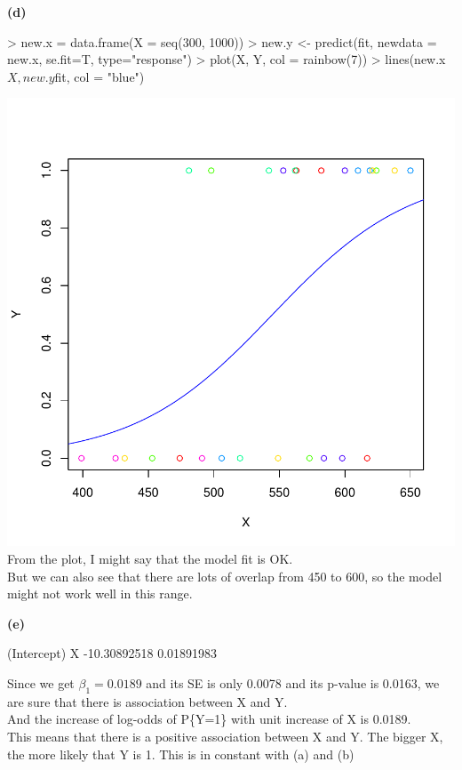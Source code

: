 \documentclass[a4paper]{article}
\renewcommand{\part}[1] {\vspace{.10in} {\bf (#1)}}
\begin{document}
\part{d}
\begin{Schunk}
\begin{Sinput}
> new.x = data.frame(X = seq(300, 1000))
> new.y <- predict(fit, newdata = new.x, se.fit=T, type="response")
> plot(X, Y, col = rainbow(7))
> lines(new.x$X, new.y$fit, col = "blue")
\end{Sinput}
\end{Schunk}
\includegraphics{category_response-1d}
{\color{red}\\
From the plot, I might say that the model fit is OK.\\
But we can also see that there are lots of overlap from 450 to 600, so the model might not work well in this range.
}

\part{e}
\begin{Schunk}
\begin{Soutput}
 (Intercept)            X 
-10.30892518   0.01891983 
\end{Soutput}
\end{Schunk}
{\color{red}
Since we get $\beta_1 = 0.0189$ and its SE is only 0.0078 and its p-value is 0.0163, we are sure that there is association between X and Y.\\
And the increase of log-odds of P\{Y=1\} with unit increase of X is 0.0189.\\
This means that there is a positive association between X and Y. The bigger X, the more likely that Y is 1. This is in constant with (a) and (b)
}
\end{document}
